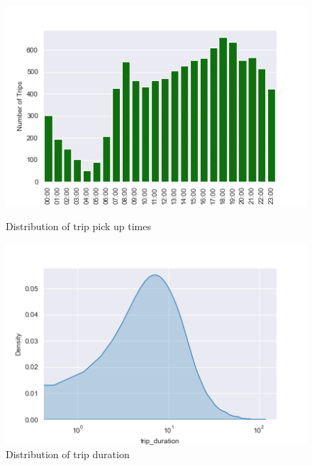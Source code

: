 \documentclass[11pt]{article}
\begin{document}
\begin{figure}[ht]
\centering
\begin{minipage}[b]{0.45\linewidth}
\includegraphics[scale=0.6]{plots/pickup_time.png}
\caption{Distribution of trip pick up times}
\label{fig:minipage1}
\end{minipage}
\quad
\begin{minipage}[b]{0.45\linewidth}
\includegraphics[scale=0.6]{plots/trip_duration.png}
\caption{Distribution of trip duration}
\label{fig:minipage2}
\end{minipage}
\end{figure}
\end{document}
